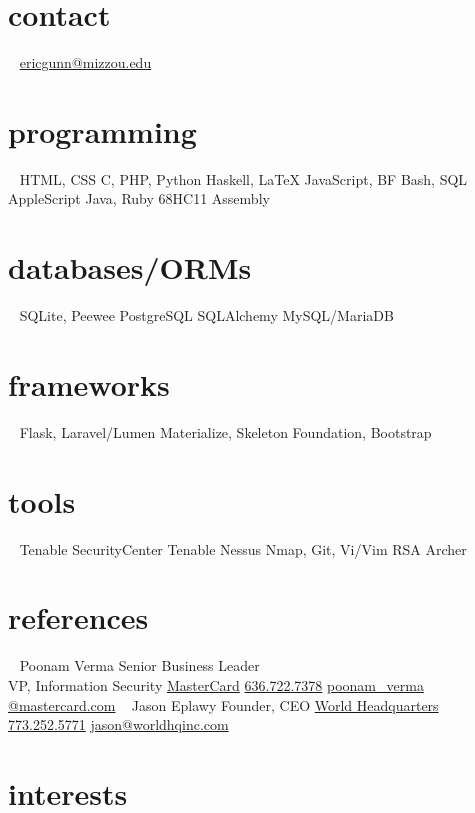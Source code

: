 \documentclass[print]{gunn-resume}
\begin{document}
\begin{aside}
  \section{contact}
  ~
    \href{mailto:ericgunn@mizzou.edu}{ericgunn@mizzou.edu}
  \section{programming}
  ~
    HTML, CSS
    C, PHP, Python
    Haskell, \LaTeX
    JavaScript, BF
    Bash, SQL
    AppleScript
    Java, Ruby
    68HC11 Assembly
 \section{databases/ORMs} 
 ~
 SQLite, Peewee
 PostgreSQL
 SQLAlchemy
 MySQL/MariaDB
 \section{frameworks}
 ~
 Flask, Laravel/Lumen
 Materialize, Skeleton
 Foundation, Bootstrap
 \section{tools}
 ~
 Tenable SecurityCenter
 Tenable Nessus
 Nmap, Git, Vi/Vim
 RSA Archer
 \section{references}
 ~
 Poonam Verma
 Senior Business Leader\\VP, Information Security
 \href{http://mastercard.com}{MasterCard}
 \href{16367227378}{636.722.7378}
\href{mailto:poonam_verma@mastercard.com}{poonam\_verma\\@mastercard.com}
 ~
 Jason Eplawy
 Founder, CEO
 \href{http://worldhqinc.com}{World Headquarters}
 \href{17732525771}{773.252.5771}
\href{mailto:jason@worldhqinc.com}{jason@worldhqinc.com}
 ~
\end{aside}

\section{interests}
\end{document}
